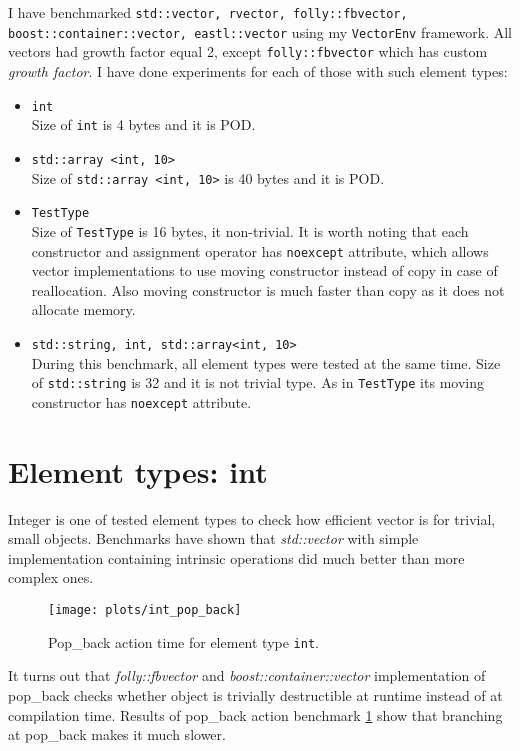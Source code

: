 \documentclass[inz, english, shortabstract]{iithesis}
\begin{document}
I have benchmarked {\tt std::vector, rvector, folly::fbvector, boost::container::vector, eastl::vector} using my {\tt VectorEnv} framework. All vectors had growth factor equal 2, except {\tt folly::fbvector} which has custom \emph{growth factor}. I have done experiments for each of those with such element types:
\begin{itemize}
\item \lstinline{int}
\\
Size of \lstinline{int} is 4 bytes and it is POD.
\item \lstinline{std::array <int, 10>}
\\
Size of \lstinline{std::array <int, 10>} is 40 bytes and it is POD.
\item \lstinline{TestType}
\\
Size of \lstinline{TestType} is 16 bytes, it non-trivial. It is worth noting that each constructor and assignment operator has {\tt noexcept} attribute, which allows vector implementations to use moving constructor instead of copy in case of reallocation. Also moving constructor is much faster than copy as it does not allocate memory.
\item \lstinline{std::string, int, std::array<int, 10>}
\\
During this benchmark, all element types were tested at the same time. Size of \lstinline{std::string} is 32 and it is not trivial type. As in \lstinline{TestType} its moving constructor has {\tt noexcept} attribute.
\end{itemize}

\section{Element types: int}
Integer is one of tested element types to check how efficient vector is for trivial, small objects. Benchmarks have shown that {\it std::vector} with simple implementation containing intrinsic operations did much better than more complex ones. 

\begin{figure}[h!]
\texttt{[image: plots/int\_pop\_back]}
\caption{Pop\_back action time for element type \lstinline{int}.}
\label{int_pop_back}
\end{figure}

It turns out that {\it folly::fbvector} and {\it boost::container::vector} implementation of pop\_back checks whether object is trivially destructible at runtime instead of at compilation time. Results of pop\_back action benchmark \ref{int_pop_back} show that branching at pop\_back makes it much slower.
\end{document}
